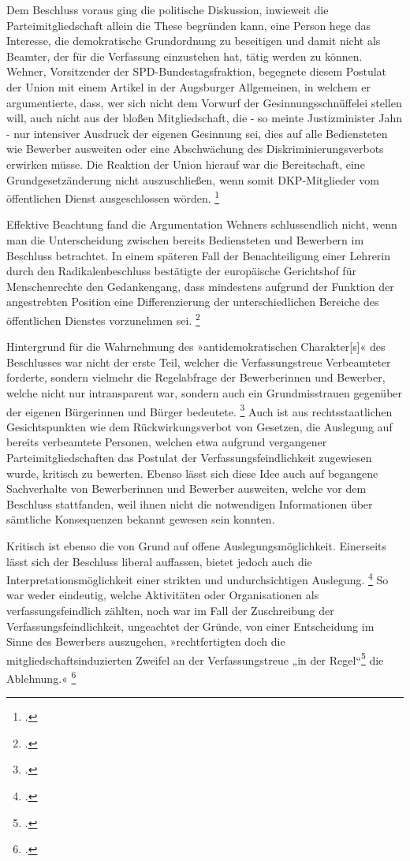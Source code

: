 \documentclass[12pt]{scrartcl}
\begin{document}
Dem Beschluss voraus ging die politische Diskussion, inwieweit die Parteimitgliedschaft allein die These begründen kann, eine Person hege das Interesse, die demokratische Grundordnung zu beseitigen und damit nicht als Beamter, der für die Verfassung einzustehen hat, tätig werden zu können. Wehner, Vorsitzender der SPD-Bundestagsfraktion, begegnete diesem Postulat der Union mit einem Artikel in der Augsburger Allgemeinen, in welchem er argumentierte, dass, wer sich nicht dem Vorwurf der Gesinnungsschnüffelei stellen will, auch nicht aus der bloßen Mitgliedschaft, die - so meinte Justizminister Jahn - nur intensiver Ausdruck der eigenen Gesinnung sei, dies auf alle Bediensteten wie Bewerber ausweiten oder eine Abschwächung des Diskriminierungsverbots erwirken müsse. Die Reaktion der Union hierauf war die Bereitschaft, eine Grundgesetzänderung nicht auszuschließen, wenn somit DKP-Mitglieder vom öffentlichen Dienst ausgeschlossen wörden. \footcite[][S. 337]{rigoll_staatsschutz_2013}

Effektive Beachtung fand die Argumentation Wehners schlussendlich nicht, wenn man die Unterscheidung zwischen bereits Bediensteten und Bewerbern im Beschluss betrachtet. In einem späteren Fall der Benachteiligung einer Lehrerin durch den Radikalenbeschluss bestätigte der europäische Gerichtshof für Menschenrechte den Gedankengang, dass mindestens aufgrund der Funktion der angestrebten Position eine Differenzierung der unterschiedlichen Bereiche des öffentlichen Dienstes vorzunehmen sei. \footcite[][S. 275]{edgar_wolfrum_verfassungsfeinde_2022}

Hintergrund für die Wahrnehmung des »antidemokratischen Charakter[s]« des Beschlusses war nicht der erste Teil, welcher die Verfassungstreue Verbeamteter forderte, sondern vielmehr die Regelabfrage der Bewerberinnen und Bewerber, welche nicht nur intransparent war, sondern auch ein Grundmisstrauen gegenüber der eigenen Bürgerinnen und Bürger bedeutete. \footcite[][S. 410]{gebhardt_handbuch_2001} Auch ist aus rechtsstaatlichen Gesichtspunkten wie dem Rückwirkungsverbot von Gesetzen, die Auslegung auf bereits verbeamtete Personen, welchen etwa aufgrund vergangener Parteimitgliedschaften das Postulat der Verfassungsfeindlichkeit zugewiesen wurde, kritisch zu bewerten. Ebenso lässt sich diese Idee auch auf begangene Sachverhalte von Bewerberinnen und Bewerber ausweiten, welche vor dem Beschluss stattfanden, weil ihnen nicht die notwendigen Informationen über sämtliche Konsequenzen bekannt gewesen sein konnten.

Kritisch ist ebenso die von Grund auf offene Auslegungsmöglichkeit. Einerseits lässt sich der Beschluss liberal auffassen, bietet jedoch auch die Interpretationsmöglichkeit einer strikten und undurchsichtigen Auslegung. \footcite[][S. 339]{rigoll_staatsschutz_2013} So war weder eindeutig, welche Aktivitäten oder Organisationen als verfassungsfeindlich zählten, noch war im Fall der Zuschreibung der Verfassungsfeindlichkeit, ungeachtet der Gründe, von einer Entscheidung im Sinne des Bewerbers auszugehen, »rechtfertigten doch die mitgliedschaftsinduzierten Zweifel an der Verfassungstreue „in der Regel“\footcite[Vgl.][S. 342]{noauthor_ministerialblatt_1972} die Ablehnung.« \footcite[][S. 339]{rigoll_staatsschutz_2013}
\end{document}
